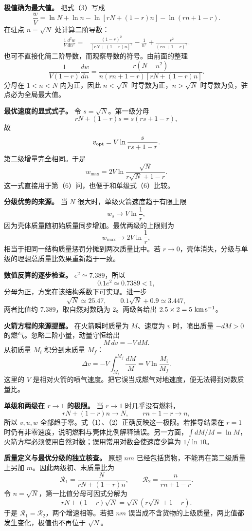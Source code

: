 \documentclass[12pt,a4paper,UTF8]{ctexart}
\begin{document}
\textbf{极值确为最大值。} 把式（3）写成 \[
\frac wV=\ln N+\ln n
-\ln[rN+(1-r)n]
-\ln(rn+1-r).
\] 在驻点 \(n=\sqrt N\) 处计算二阶导数： \[
\begin{aligned}
\frac1V\frac{d^2w}{dn^2}
={}&\frac{(1-r)^2}{[rN+(1-r)n]^2}
-\frac1{n^2}
+\frac{r^2}{(rn+1-r)^2}.
\end{aligned}
\] 也可不直接化简二阶导数，而观察导数的符号。由前面的整理 \[
\frac1{V(1-r)}\frac{dw}{dn}
=\frac{r(N-n^2)}
{n(rn+1-r)[rN+(1-r)n]}.
\tag{8}
\] 分母在 \(1<n<N\) 内为正，因此 \(n<\sqrt N\) 时导数为正，\(n>\sqrt N\)
时导数为负，驻点必为全局最大值。

\textbf{最优速度的显式式子。} 令 \(s=\sqrt N\)。第一级分母 \[
rN+(1-r)s=s(rs+1-r),
\] 故 \[
v_{\rm opt}
=V\ln\frac{s}{rs+1-r}.
\] 第二级增量完全相同。于是 \[
\boxed{
w_{\max}=2V\ln\frac{\sqrt N}
{r\sqrt N+1-r}
}. \tag{9}
\] 这一式直接用于第（6）问，也便于和单级式（6）比较。

\textbf{分级优势的来源。} 当 \(N\) 很大时，单级火箭速度趋于有限上限 \[
w_s\to V\ln\frac1r,
\] 因为壳体质量随初始质量同步增加。最优两级的上限则为 \[
w_{\max}\to2V\ln\frac1r,
\] 相当于把同一结构质量惩罚分摊到两次质量比中。若
\(r\to0\)，壳体消失，分级与单级的理想总质量比效果重新趋于一致。

\textbf{数值反算的逐步检查。} \(e^2\simeq7.389\)，所以 \[
0.1e^2\simeq0.7389<1,
\] 分母为正，方案在该结构系数下可实现。进一步 \[
\sqrt N\simeq25.47,\qquad
0.1\sqrt N+0.9\simeq3.447,
\] 两者比值约 \(7.389\)，取自然对数确为 \(2\)。两级各给出
\(2.5\times2=5\ {\rm km\,s^{-1}}\)。

\textbf{火箭方程的来源提醒。} 在火箭瞬时质量为 \(M\)、速度为 \(v\)
时，喷出质量 \(-dM>0\) 的燃气。忽略二阶小量，动量守恒给出 \[
M\,dv=-V\,dM.
\] 从初质量 \(M_i\) 积分到末质量 \(M_f\)： \[
\Delta v=-V\int_{M_i}^{M_f}\frac{dM}{M}
=V\ln\frac{M_i}{M_f}.
\] 这里的 \(V\)
是相对火箭的喷气速度。把它误当成燃气对地速度，便无法得到对数质量比。

\textbf{单级和两级在 \(r\to1\) 的极限。} 当 \(r\to1\) 时几乎没有燃料，
\[
rN+(1-r)n\to N,\qquad rn+1-r\to n,
\] 所以 \(v,u,w\)
全部趋于零。式（1）、（2）正确反映这一极限。若推导结果在 \(r=1\)
时仍有非零速度，说明燃料与壳体比例解释错误。另一方面，\(\int dM/M=\ln M\)，火箭方程必须使用自然对数；误用常用对数会使速度少算为
\(1/\ln 10\)。

\textbf{质量定义与最优分级的独立核查。} 原题 \(nm\)
已经包括货物，不能再在第二级质量上另加 \(m\)。因此两级初、末质量比为 \[
\mathcal R_1=\frac{N}{rN+(1-r)n},\qquad
\mathcal R_2=\frac{n}{rn+1-r}.
\] 令 \(n=\sqrt N\)，第一比值分母可因式分解为 \[
rN+(1-r)\sqrt N=\sqrt N(r\sqrt N+1-r).
\] 于是 \(\mathcal R_1=\mathcal R_2\)，两个增速相等。若把 \(nm\)
误当成不含货物的上级质量，两比值都发生变化，极值也不再位于 \(\sqrt N\)。
\end{document}
